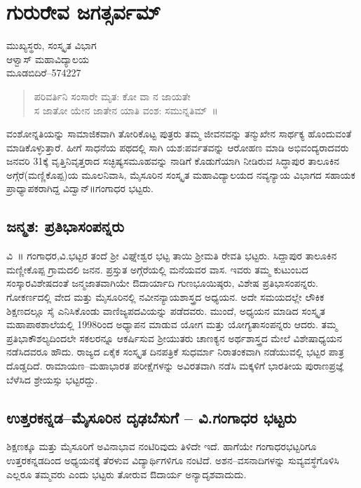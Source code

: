 \chapter{ಗುರುರೇವ ಜಗತ್ಸರ್ವಮ್}

\begin{center}
\smallskip
ಮುಖ್ಯಸ್ಥರು, ಸಂಸ್ಕೃತ ವಿಭಾಗ \\
ಆಳ್ವಾಸ್ ಮಹಾವಿದ್ಯಾಲಯ\\
ಮೂಡಬಿದಿರೆ–574227
\addrule
\end{center}
\begin{verse}
ಪರಿವರ್ತಿನಿ ಸಂಸಾರೇ ಮೃತ: ಕೋ ವಾ ನ ಜಾಯತೇ\\
ಸ ಜಾತೋ ಯೇನ ಜಾತೇನ ಯಾತಿ ವಂಶ: ಸಮುನ್ನತಿಮ್~॥
\end{verse}
ವಂಶೋನ್ನತಿಯನ್ನು ಸಾಮಾಜಿಕವಾಗಿ ತೋರಿಕೊಟ್ಟ ಪುತ್ರರು ತಮ್ಮ ಜೀವನವನ್ನು ತನ್ಮುಖೇನ ಸಾರ್ಥಕ್ಯ ಹೊಂದುವಂತೆ ಮಾಡಿಕೊಳ್ಳುತ್ತಾರೆ. ಹೀಗೆ ಸಾಧನೆಯ ಪಥದಲ್ಲಿ ಸಾಗಿ ಯಶ:ಪರ್ವತವನ್ನು ಆರೋಹಣ ಮಾಡಿ ಅಭಿವಂದ್ಯರಾದವರು ಜನವರಿ 31ಕ್ಕೆ ವೃತ್ತಿನಿವೃತ್ತರಾದ ಸಚ್ಛಿಷ್ಯಸಮೂಹವನ್ನು ನಾಡಿಗೆ ಕೊಡುಗೆಯಾಗಿ ನೀಡಿರುವ ಸಿದ್ಧಾಪುರ ತಾಲೂಕಿನ ಅಗ್ಗೆರೆ(ಮಣ್ಣಿಕೊಪ್ಪ)ಯ ಮೂಲನಿವಾಸಿ, ಮೈಸೂರಿನ ಸಂಸ್ಕೃತ ಮಹಾವಿದ್ಯಾಲಯದ ನವ್ಯನ್ಯಾಯ ವಿಭಾಗದ ಸಹಾಯಕ ಪ್ರಾಧ್ಯಾಪಕರಾಗಿದ್ದ ವಿದ್ವಾನ್॥ಗಂಗಾಧರ ಭಟ್ಟರು.

\section*{ಜನ್ಮತ: ಪ್ರತಿಭಾಸಂಪನ್ನರು}

ವಿ~॥ ಗಂಗಾಧರ,ವಿ.ಭಟ್ಟರ ತಂದೆ ಶ್ರೀ ವಿಘ್ನೇಶ್ವರ ಭಟ್ಟ ತಾಯಿ ಶ್ರೀಮತಿ ರೇವತಿ ಭಟ್ಟರು. ಸಿದ್ದಾಪುರ ತಾಲೂಕಿನ ಮಣ್ಣೀಕೊಪ್ಪ ಗ್ರಾಮದಲಿ ಜನನ. ಪ್ರಸ್ತುತ ಅಗ್ಗೆರೆಯಲ್ಲಿ ಮನೆಯವರ ವಾಸ. ಇವರು ತಮ್ಮ ಕುಟುಂಬದ ಸಂಸ್ಕಾರವಿಶೇಷದಂತೆ ಜನ್ಮಜಾತವಾಗಿಯೇ ಔದಾರ್ಯಾದಿ ಗುಣಭೂಯಿಷ್ಠರು, ವಿಶೇಷ ಪ್ರತಿಭಾಸಂಪನ್ನರು. ಗೋಕರ್ಣದಲ್ಲಿ ವೇದ ಮತ್ತು ಮೈಸೂರಿನಲ್ಲಿ ನವೀನನ್ಯಾಯಶಾಸ್ತ್ರದ ಅಧ್ಯಯನ. ಅದೇ ಸಮಯದಲ್ಲೇ ಲೌಕಿಕ ಶಿಕ್ಷಣದಲ್ಲೂ ಸೈ ಎನಿಸಿಕೊಂಡು ವಾಣಿಜ್ಯಪದವಿಯನ್ನು ಪಡೆದವರು.  ಮುಂದೆ, ಅಧ್ಯಯನ ಮಾಡಿದ ಸಂಸ್ಕೃತ ಮಹಾಪಾಠಶಾಲೆಯಲ್ಲಿ 1998ರಿಂದ ಅಧ್ಯಾಪನ ಮಾಡುವ ಯೋಗ ಮತ್ತು ಯೋಗ್ಯತಾಸಂಪನ್ನರು ಆದರು. ತಮ್ಮ ಪ್ರತಿಭಾಕೌಶಲ್ಯದಿಂದಲೇ ಸಕಲರನ್ನೂ ಆಕರ್ಷಿಸುವ ಶ್ರೀಯುತರು ಚಾಣಕ್ಯನ ಅರ್ಥಶಾಸ್ತ್ರದ ಮೇಲೆ ವಿಶೇಷಾಧ್ಯಯನ ನಡೆಸಿದವರೂ ಹೌದು. ರಾಜ್ಯದ ಏಕೈಕ ಸಂಸ್ಕೃತ ದಿನಪತ್ರಿಕೆ ಸುಧರ್ಮಾ ನಿರಾತಂಕವಾಗಿ ನಡೆಯುವಲ್ಲಿ ಭಟ್ಟರ ಪಾತ್ರ ದೊಡ್ಡದಿದೆ. ರಾಮಾಯಣ–ಮಹಾಭಾರತ ಪರೀಕ್ಷೆಗಳನ್ನು ಅವಿರತವಾಗಿ ನಡೆಸಿ ಮಕ್ಕಳಿಗೆ ಭಾರತೀಯ ಪುರಾಣಪ್ರಜ್ಞೆ ಬೆಳೆಸಿದ ಶ್ರೇಯಸ್ಸು ಭಟ್ಟರದ್ದು.

\section*{ಉತ್ತರಕನ್ನಡ–ಮೈಸೂರಿನ ದೃಢಬೆಸುಗೆ – ವಿ.ಗಂಗಾಧರ ಭಟ್ಟರು}

ಶಿಕ್ಷಣಕ್ಕೂ ಮತ್ತು ಮೈಸೂರಿಗೆ ಅವಿನಾಭಾವ ನಂಟಿರಿವುದು ತಿಳಿದೇ ಇದೆ. ಹಾಗೆಯೇ  ಗಂಗಾಧರಭಟ್ಟರಿಗೂ ಉತ್ತರಕನ್ನಡದಿಂದ ಅಧ್ಯಯನಕ್ಕೆ ತೆರಳುವ ವಿದ್ಯಾರ್ಥಿಗಳಿಗೂ ನಂಟಿದೆ. ಅಶನ–ವಸನಾದಿಗಳನ್ನು ಸುವ್ಯವಸ್ಥೆಗೊಳಿಸಿ ಎಲ್ಲರೂ ತಮ್ಮವರು ಎಂದು ಭಟ್ಟರು ತೋರುವ ಔದಾರ್ಯ ಅನ್ಯಾದೃಶವಾದುದು.

